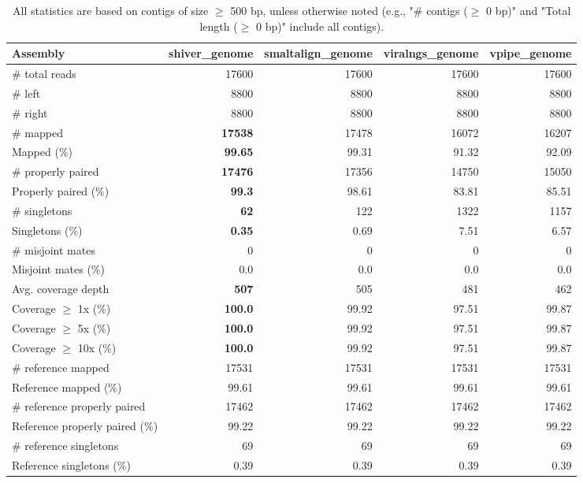 \documentclass[12pt,a4paper]{article}
\begin{document}
\begin{table}[ht]
\begin{center}
\caption{All statistics are based on contigs of size $\geq$ 500 bp, unless otherwise noted (e.g., "\# contigs ($\geq$ 0 bp)" and "Total length ($\geq$ 0 bp)" include all contigs).}
\begin{tabular}{|l*{4}{|r}|}
\hline
Assembly & shiver\_genome & smaltalign\_genome & viralngs\_genome & vpipe\_genome \\ \hline
\# total reads & 17600 & 17600 & 17600 & 17600 \\ \hline
\# left & 8800 & 8800 & 8800 & 8800 \\ \hline
\# right & 8800 & 8800 & 8800 & 8800 \\ \hline
\# mapped & {\bf 17538} & 17478 & 16072 & 16207 \\ \hline
Mapped (\%) & {\bf 99.65} & 99.31 & 91.32 & 92.09 \\ \hline
\# properly paired & {\bf 17476} & 17356 & 14750 & 15050 \\ \hline
Properly paired (\%) & {\bf 99.3} & 98.61 & 83.81 & 85.51 \\ \hline
\# singletons & {\bf 62} & 122 & 1322 & 1157 \\ \hline
Singletons (\%) & {\bf 0.35} & 0.69 & 7.51 & 6.57 \\ \hline
\# misjoint mates & 0 & 0 & 0 & 0 \\ \hline
Misjoint mates (\%) & 0.0 & 0.0 & 0.0 & 0.0 \\ \hline
Avg. coverage depth & {\bf 507} & 505 & 481 & 462 \\ \hline
Coverage $\geq$ 1x (\%) & {\bf 100.0} & 99.92 & 97.51 & 99.87 \\ \hline
Coverage $\geq$ 5x (\%) & {\bf 100.0} & 99.92 & 97.51 & 99.87 \\ \hline
Coverage $\geq$ 10x (\%) & {\bf 100.0} & 99.92 & 97.51 & 99.87 \\ \hline
\# reference mapped & 17531 & 17531 & 17531 & 17531 \\ \hline
Reference mapped (\%) & 99.61 & 99.61 & 99.61 & 99.61 \\ \hline
\# reference properly paired & 17462 & 17462 & 17462 & 17462 \\ \hline
Reference properly paired (\%) & 99.22 & 99.22 & 99.22 & 99.22 \\ \hline
\# reference singletons & 69 & 69 & 69 & 69 \\ \hline
Reference singletons (\%) & 0.39 & 0.39 & 0.39 & 0.39 \\ \hline

\end{tabular}
\end{center}
\end{table}
\end{document}
